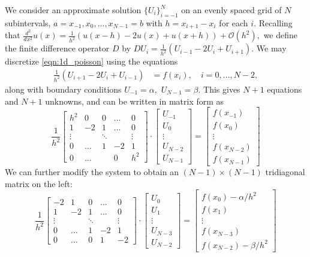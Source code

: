 We consider an approximate solution $\{U_i\}_{i=-1}^N$ on an evenly spaced grid of $N$ subintervals, $a = x_{-1}, x_0, \ldots, x_{N-1} = b$ with $h = x_{i+1}-x_i$ for each $i$.
Recalling that $\frac{d^2}{dx^2}u(x) = \frac{1}{h^2}\left(u(x-h) -2u(x) + u(x+h)\right) + \mathcal{O}(h^2),$ we define the finite difference operator $D$ by  $DU_i = \frac{1}{h^2}\left(U_{i-1} -2U_i + U_{i+1}\right)$.
We may discretize \eqref{eqn:1d_poisson} using the equations 
\begin{align*}
	\frac{1}{h^2} (U_{i+1}- 2U_i + U_{i-1})  &= f(x_i), \quad i = 0, \ldots, N-2,
\end{align*}
along with boundary conditions $U_{-1} = \alpha,$ $U_{N-1} = \beta$.
This gives $N+1$ equations and $N+1$ unknowns, and can be written in matrix form as 
\[ \frac{1}{h^2} \begin{bmatrix}h^2 & 0 &0&\hdots &0 \\ 1 &-2 & 1 &\hdots &0\\ \vdots &  & \ddots & &\vdots \\
0 & \hdots & 1 & -2 & 1 \\ 0 & \hdots & & 0 & h^2
\end{bmatrix} \cdot \begin{bmatrix}U_{-1}\\U_0\\ \vdots \\U_{N-2} \\U_{N-1}\end{bmatrix} = \begin{bmatrix}f(x_{-1})\\f(x_0)\\ \vdots \\ f(x_{N-2}) \\ f(x_{N-1}) \end{bmatrix}\]
We can further modify the system to obtain an $(N-1)\times (N-1)$ tridiagonal matrix on the left: 
\[\frac{1}{h^2} \begin{bmatrix}-2 & 1 &0 & \hdots &0\\ 1 &-2 & 1 &\hdots &0\\ \vdots &  & \ddots & &\vdots \\ 0 & \hdots & 1 & -2 & 1 \\
0 & \hdots & 0 & 1 & -2 
\end{bmatrix} \cdot \begin{bmatrix}U_0\\U_1\\ \vdots \\U_{N-3}\\U_{N-2}\end{bmatrix} = \begin{bmatrix}f(x_0) -\alpha/h^2 \\f(x_1)\\ \vdots \\ f(x_{N-3})\\ f(x_{N-2})-\beta/h^2 \end{bmatrix}\]

